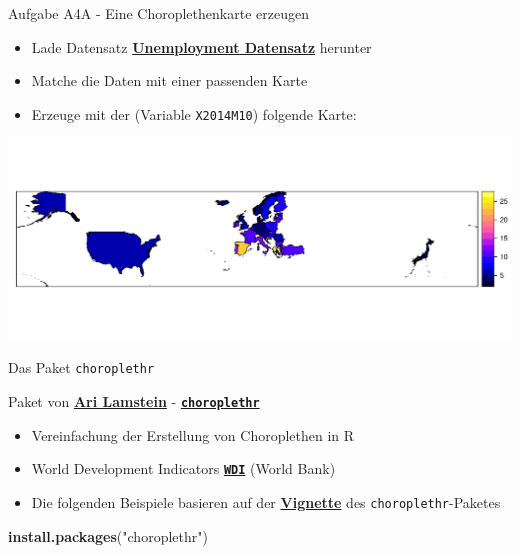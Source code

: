 \documentclass[ignorenonframetext,]{beamer}
\newenvironment{Shaded}{\begin{snugshade}}{\end{snugshade}}
\newcommand{\KeywordTok}[1]{\textcolor[rgb]{0.13,0.29,0.53}{\textbf{#1}}}
\newcommand{\NormalTok}[1]{#1}
\newcommand{\StringTok}[1]{\textcolor[rgb]{0.31,0.60,0.02}{#1}}
\providecommand{\tightlist}{%
  \setlength{\itemsep}{0pt}\setlength{\parskip}{0pt}}
\begin{document}
\begin{frame}[fragile]{Aufgabe A4A - Eine Choroplethenkarte erzeugen}
\protect\hypertarget{aufgabe-a4a---eine-choroplethenkarte-erzeugen}{}

\begin{itemize}
\tightlist
\item
  Lade Datensatz
  \href{https://raw.githubusercontent.com/Japhilko/GeoData/master/2015/data/Unemployment.csv}{\textbf{Unemployment
  Datensatz}} herunter
\item
  Matche die Daten mit einer passenden Karte
\item
  Erzeuge mit der (Variable \texttt{X2014M10}) folgende Karte:
\end{itemize}

\includegraphics{A5_Choroplethen_files/figure-beamer/unnamed-chunk-15-1.pdf}

\end{frame}

\begin{frame}[fragile]{Das Paket \texttt{choroplethr}}
\protect\hypertarget{das-paket-choroplethr}{}

\begin{block}{Paket von \href{http://www.arilamstein.com/}{\textbf{Ari
Lamstein}} -
\href{https://cran.r-project.org/web/packages/choroplethr/index.html}{\textbf{\texttt{choroplethr}}}}

\begin{itemize}
\item
  Vereinfachung der Erstellung von Choroplethen in R
\item
  World Development Indicators
  \href{https://cran.r-project.org/web/packages/WDI/index.html}{\textbf{\texttt{WDI}}}
  (World Bank)
\item
  Die folgenden Beispiele basieren auf der
  \href{https://cran.r-project.org/web/packages/choroplethr/index.html}{\textbf{Vignette}}
  des \texttt{choroplethr}-Paketes
\end{itemize}

\begin{Shaded}
\begin{Highlighting}[]
\KeywordTok{install.packages}\NormalTok{(}\StringTok{"choroplethr"}\NormalTok{)}
\end{Highlighting}
\end{Shaded}

\end{block}

\end{frame}
\end{document}
